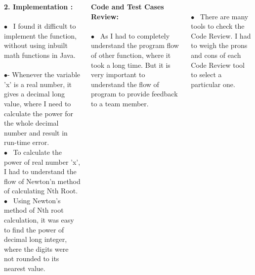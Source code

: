 \documentclass[20pt,margin=1in,innermargin=-4.5in,blockverticalspace=-0.25in]{tikzposter}
\begin{document}
\begin{columns}
{    {\normalsize \textbf{2. Implementation :}}\\
    \\$\bullet$~ I found it difficult to implement the function, without using inbuilt math functions in Java. \\
     \\$\bullet$- Whenever the variable 'x' is a real number, it gives a decimal long value, where I need to calculate the power for the whole decimal number and result in run-time error. 
    \\$\bullet$~ To calculate the power of real number 'x', I had to understand the flow of Newton'n method of calculating Nth Root.
   \\$\bullet$~ Using Newton's method of Nth root calculation, it was easy to find the power of decimal long integer, where the digits were not rounded to its nearest value.
    
    {\normalsize \textbf{Code and Test Cases Review:}}\\
     \\$\bullet$~  As I had to completely understand the program flow of other function, where it took a long time. But it is very important to understand the flow of program to provide feedback to a team member.
     
     \\$\bullet$~ There are many tools to check the Code Review. I had to weigh the prons and cons of each Code Review tool to select a particular one.
\\
    }
    



\end{columns}
\end{document}
